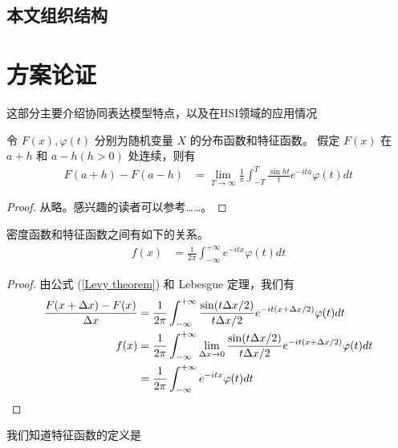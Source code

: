 \documentclass[12pt,a4paper]{article}
\begin{document}
\subsection{本文组织结构}







\section{方案论证}
这部分主要介绍协同表达模型特点，以及在HSI领域的应用情况


\begin{theorem}[L\'{e}vy\index{L\'{e}vy 定理}]
令 $F(x),\varphi(t)$ 分别为随机变量 $X$ 的分布函数和特征函数。
假定 $F(x)$ 在 $a+h$ 和 $a-h (h>0)$ 处连续，则有
\begin{align}
 \label{Levy theorem}  %
F(a+h)-F(a-h)&=\lim_{T\rightarrow\infty}\frac{1}{\pi}\int^{T}_{-T}\frac{\sin ht}{t} 
e^{-ita}\varphi(t)dt
\end{align}
\end{theorem}
\begin{proof}
  从略。感兴趣的读者可以参考……。
\end{proof}


\begin{corollary}
密度函数和特征函数之间有如下的关系。
\begin{align}
 \label{DensityCharacteristic}   %
  f(x)&=\frac{1}{2\pi}\int^{+\infty}_{-\infty} e^{-itx}\varphi(t)dt
\end{align}
\end{corollary}

\begin{proof}
由公式 (\ref{Levy theorem}) 和 Lebesgue 定理，我们有
\begin{align*}
 \frac{F(x+\Delta x)-F(x)}{\Delta x}&=\frac{1}{2\pi}\int^{+\infty}_{-\infty}
 \frac{\sin(t\Delta x/2)}{t\Delta x/2} e^{-it(x+\Delta x/2)}\varphi(t) dt\\
  f(x)&=\frac{1}{2\pi}\int^{+\infty}_{-\infty}\lim_{\Delta x\rightarrow 0}
 \frac{\sin(t\Delta x/2)}{t\Delta x/2} e^{-it(x+\Delta x/2)}\varphi(t) dt\\
  &=\frac{1}{2\pi}\int^{+\infty}_{-\infty} e^{-itx}\varphi(t)dt\qedhere
\end{align*}
\end{proof}

我们知道特征函数的定义是
\end{document}
